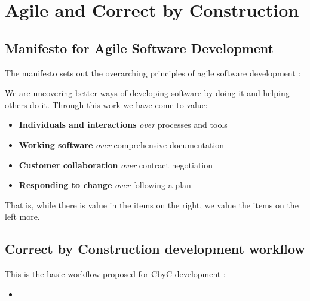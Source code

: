 
\chapter{Agile and Correct by Construction} %

\label{Chapter 2} %

\section{Manifesto for Agile Software Development}

The manifesto sets out the overarching principles of agile software development \parencite{Beck2001ManifestoFA}:

\begin{displayquote}
We are uncovering better ways of developing software by doing it and helping 
others do it. Through this work we have come to value:

\begin{itemize}
	\item \textbf{Individuals and interactions} \textit{over} processes and tools 
	\item \textbf{Working software} \textit{over} comprehensive documentation 
	\item \textbf{Customer collaboration} \textit{over} contract negotiation 
	\item \textbf{Responding to change} \textit{over} following a plan 
\end{itemize}

That is, while there is value in the items on the right, we value the items on
the left more.
\end{displayquote}

\section{Correct by Construction development workflow}
This is the basic workflow proposed for CbyC development \parencite{Tokeneer}:

\begin{itemize}
	\item 
\end{itemize}



